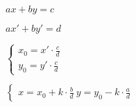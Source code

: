 $ax + by = c$

$ax '+by' = d$

$\begin{cases}x_{0} = x '\cdot\frac{c}{d}\\ y_{0}=y'\cdot\frac{c}{ d }\end{ cases }$

$\begin{cases}x = x_{0} + k\cdot\frac{b}{ d }\ y = y_{0} - k\cdot\frac{a}{ d }\end
{ cases }$
